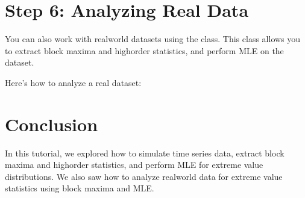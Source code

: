 \documentclass[a4paper,11pt,openany,english]{sphinxmanual}
\begin{document}
\section{Step 6: Analyzing Real Data}
\label{\detokenize{topt:step-6-analyzing-real-data}}
\sphinxAtStartPar
You can also work with real\sphinxhyphen{}world datasets using the  class. This class allows you to extract block maxima and high\sphinxhyphen{}order statistics, and perform MLE on the dataset.

\sphinxAtStartPar
Here’s how to analyze a real dataset:

\begin{sphinxVerbatim}[commandchars=\\\{\}]
   

  \PYG{p}{[}      \PYG{p}{]}

 

  


\end{sphinxVerbatim}


\section{Conclusion}
\label{\detokenize{topt:conclusion}}
\sphinxAtStartPar
In this tutorial, we explored how to simulate time series data, extract block maxima and high\sphinxhyphen{}order statistics, and perform MLE for extreme value distributions. We also saw how to analyze real\sphinxhyphen{}world data for extreme value statistics using block maxima and MLE.
\end{document}

